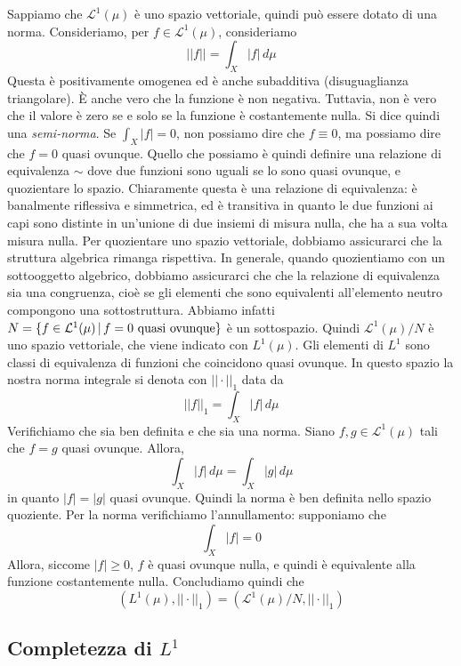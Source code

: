 \documentclass[a4paper]{article}
\begin{document}
\begin{radioactive}
Sappiamo che \(\mathcal L^1(\mu)\) è uno spazio vettoriale, quindi può essere dotato di una norma.
Consideriamo, per \(f \in \mathcal L^1(\mu)\), consideriamo
\[
    ||f|| = \int_X |f|\,d\mu
\]
Questa è positivamente omogenea ed è anche subadditiva (disuguaglianza triangolare).
È anche vero che la funzione è non negativa. Tuttavia, non è vero che
il valore è zero se e solo se la funzione è costantemente nulla.
Si dice quindi una \emph{semi-norma}.
Se \(\int_X |f| = 0\), non possiamo dire che \(f\equiv0\),
ma possiamo dire che \(f=0\) quasi ovunque.
Quello che possiamo è quindi definire una relazione di equivalenza \(\sim\)
dove due funzioni sono uguali se lo sono quasi ovunque, e quozientare lo spazio.
Chiaramente questa è una relazione di equivalenza: è banalmente
riflessiva e simmetrica, ed è transitiva in quanto le due funzioni ai capi
sono distinte in un'unione di due insiemi di misura nulla, che ha a sua volta misura nulla.
Per quozientare uno spazio vettoriale, dobbiamo assicurarci
che la struttura algebrica rimanga rispettiva.
In generale, quando quozientiamo con un sottooggetto algebrico, dobbiamo assicurarci
che che la relazione di equivalenza sia una congruenza, cioè
se gli elementi che sono equivalenti all'elemento neutro compongono una sottostruttura.
Abbiamo infatti \(N = \{f \in \mathcal L^1(\mu) \,|\, f = 0 \text{ quasi ovunque}\}\)
è un sottospazio. Quindi \(\mathcal L^1(\mu) / N\) è uno spazio vettoriale,
che viene indicato con \(L^1(\mu)\).
Gli elementi di \(L^1\) sono classi di equivalenza di funzioni che coincidono quasi ovunque.
In questo spazio la nostra norma integrale si denota con \(||\cdot||_1\) data da
\[
    ||f||_1 = \int_X |f|\,d\mu
\]
Verifichiamo che sia ben definita e che sia una norma.
Siano \(f,g \in \mathcal L^1(\mu)\) tali che \(f=g\) quasi ovunque.
Allora, \[
    \int_X |f|\,d\mu = \int_X |g|\,d\mu
\]
in quanto \(|f| = |g|\) quasi ovunque. Quindi la norma è ben definita nello spazio quoziente.
Per la norma verifichiamo l'annullamento: supponiamo che
\[
    \int_X |f| = 0
\]
Allora, siccome \(|f| \geq 0\), \(f\) è quasi ovunque nulla, e quindi
è equivalente alla funzione costantemente nulla.
Concludiamo quindi che
\[
    (L^1(\mu), ||\cdot||_1) = (\mathcal L^1(\mu) / N, ||\cdot||_1)
\]
\end{radioactive}
\subsection{Completezza di \(L^1\)}
\end{document}
